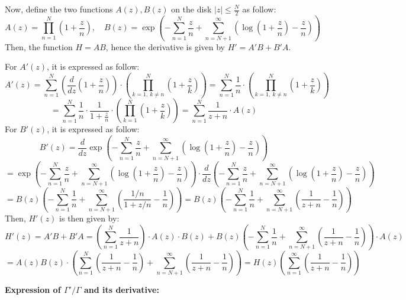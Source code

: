 \documentclass{article}
\begin{document}
\hfil

Now, define the two functions $A(z),B(z)$ on the disk $|z|\leq \frac{N}{2}$ as follow:
$$A(z)=\prod_{n=1}^{N}\left(1+\frac{z}{n}\right),\quad B(z)=\exp\left(-\sum_{n=1}^{N}\frac{z}{n}+\sum_{n=N+1}^{\infty}\left(\log\left(1+\frac{z}{n}\right)-\frac{z}{n}\right)\right)$$
Then, the function $H=AB$, hence the derivative is given by $H'=A'B+B'A$.

For $A'(z)$, it is expressed as follow:
$$A'(z)=\sum_{n=1}^{N}\left(\frac{d}{dz}\left(1+\frac{z}{n}\right)\right)\cdot \left(\prod_{k=1,\ k\neq n}^{N}\left(1+\frac{z}{k}\right)\right)=\sum_{n=1}^{N}\frac{1}{n}\cdot\left(\prod_{k=1,\ k\neq n}^{N}\left(1+\frac{z}{k}\right)\right)$$
$$=\sum_{n=1}^{N}\frac{1}{n}\cdot\frac{1}{1+\frac{z}{n}}\cdot\left(\prod_{k=1}^{N}\left(1+\frac{z}{k}\right)\right) = \sum_{n=1}^{N}\frac{1}{z+n}\cdot A(z)$$
For $B'(z)$, it is expressed as follow:
$$B'(z)=\frac{d}{dz}\exp\left(-\sum_{n=1}^{N}\frac{z}{n}+\sum_{n=N+1}^{\infty}\left(\log\left(1+\frac{z}{n}\right)-\frac{z}{n}\right)\right)$$
$$=\exp\left(-\sum_{n=1}^{N}\frac{z}{n}+\sum_{n=N+1}^{\infty}\left(\log\left(1+\frac{z}{n}\right)-\frac{z}{n}\right)\right)\cdot \frac{d}{dz}\left(-\sum_{n=1}^{N}\frac{z}{n}+\sum_{n=N+1}^{\infty}\left(\log\left(1+\frac{z}{n}\right)-\frac{z}{n}\right)\right)$$
$$= B(z)\left(-\sum_{n=1}^{N}\frac{1}{n}+\sum_{n=N+1}^{\infty}\left(\frac{1/n}{1+z/n}-\frac{1}{n}\right)\right) =B(z)\left(-\sum_{n=1}^{N}\frac{1}{n}+\sum_{n=N+1}^{\infty}\left(\frac{1}{z+n}-\frac{1}{n}\right)\right)$$
Then, $H'(z)$ is then given by:
$$H'(z)=A'B+B'A = \left(\sum_{n=1}^{N}\frac{1}{z+n}\right)\cdot A(z)\cdot B(z)+B(z)\left(-\sum_{n=1}^{N}\frac{1}{n}+\sum_{n=N+1}^{\infty}\left(\frac{1}{z+n}-\frac{1}{n}\right)\right)\cdot A(z)$$
$$=A(z)B(z)\cdot\left(\sum_{n=1}^{N}\left(\frac{1}{z+n}-\frac{1}{n}\right)+\sum_{n=N+1}^{\infty}\left(\frac{1}{z+n}-\frac{1}{n}\right)\right)= H(z)\left(\sum_{n=1}^{\infty}\left(\frac{1}{z+n}-\frac{1}{n}\right)\right)$$

\hfil

\textbf{Expression of $\Gamma'/\Gamma$ and its derivative:}
\end{document}
